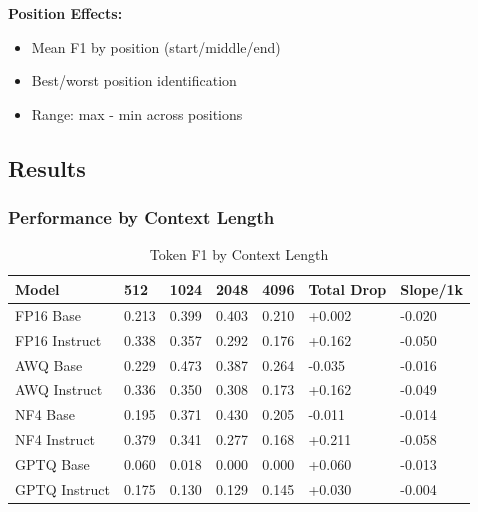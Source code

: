 \documentclass[11pt,a4paper]{article}
\begin{document}
\textbf{Position Effects:}
\begin{itemize}
\item Mean F1 by position (start/middle/end)
\item Best/worst position identification
\item Range: max - min across positions
\end{itemize}

\subsection{Results}

\subsubsection{Performance by Context Length}

\begin{table}[H]
\centering
\caption{Token F1 by Context Length}
\small
\begin{tabularx}{\textwidth}{@{}X C{1.5cm} C{1.5cm} C{1.5cm} C{1.5cm} C{1.8cm} C{1.8cm}@{}}
\toprule
\textbf{Model} & \textbf{512} & \textbf{1024} & \textbf{2048} & \textbf{4096} & \textbf{Total Drop} & \textbf{Slope/1k} \\
\midrule
FP16 Base & 0.213 & 0.399 & 0.403 & 0.210 & +0.002 & -0.020 \\
FP16 Instruct & 0.338 & 0.357 & 0.292 & 0.176 & +0.162 & -0.050 \\
AWQ Base & 0.229 & 0.473 & 0.387 & 0.264 & -0.035 & -0.016 \\
AWQ Instruct & 0.336 & 0.350 & 0.308 & 0.173 & +0.162 & -0.049 \\
NF4 Base & 0.195 & 0.371 & 0.430 & 0.205 & -0.011 & -0.014 \\
NF4 Instruct & 0.379 & 0.341 & 0.277 & 0.168 & +0.211 & -0.058 \\
GPTQ Base & 0.060 & 0.018 & 0.000 & 0.000 & +0.060 & -0.013 \\
GPTQ Instruct & 0.175 & 0.130 & 0.129 & 0.145 & +0.030 & -0.004 \\
\bottomrule
\end{tabularx}
\end{table}
\end{document}
